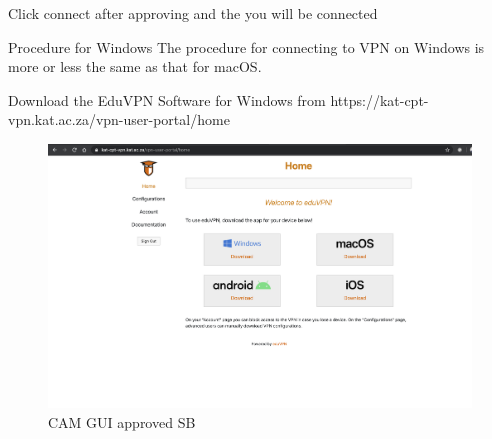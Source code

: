 Click connect after approving and the you will be connected

Procedure for Windows
The procedure for connecting to VPN on Windows is more or less the same as that for macOS. 

Download the EduVPN Software for Windows from https://kat-cpt-vpn.kat.ac.za/vpn-user-portal/home
\begin{figure}[!thb]
	\centering
	\includegraphics[scale=0.23]{Chapters/images/image106.png}
	
	\caption{CAM GUI approved SB }
	\label{fig:image106}
\end{figure}















